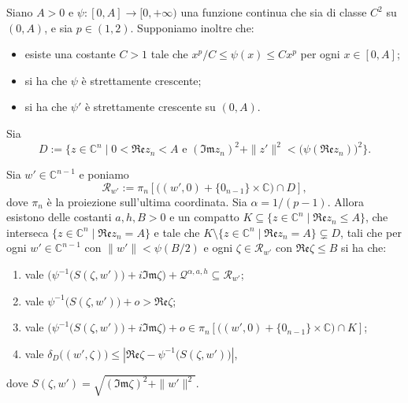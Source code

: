 \begin{lm}\label{6punto4}
    Siano $A>0$ e $\psi:[0,A]\longrightarrow[0,+\infty)$ una funzione continua che sia di classe $C^2$ su $(0,A)$, e sia $p\in(1,2)$. Supponiamo inoltre che:
    \begin{itemize}
        \item esiste una costante $C>1$ tale che $x^p/C\le\psi(x)\le Cx^p$ per ogni $x\in[0,A]$;
        \item si ha che $\psi$ è strettamente crescente;
        \item si ha che $\psi'$ è strettamente crescente su $(0,A)$.
    \end{itemize}

    Sia
    $$D:=\{z\in\mathbb{C}^n\mid 0<\mathfrak{Re}z_n<A\text{ e }(\mathfrak{Im}z_n)^2+\|z'\|^2<\big(\psi(\mathfrak{Re}z_n)\big)^2\}.$$

    Sia $w'\in\mathbb{C}^{n-1}$ e poniamo
    $$\mathcal{R}_{w'}:=\pi_n\left[\big((w',0)+\{0_{n-1}\}\times\mathbb{C}\big)\cap D\right],$$
    dove $\pi_n$ è la proiezione sull'ultima coordinata. Sia $\alpha=1/(p-1)$. Allora esistono delle costanti $a,h,B>0$ e un compatto $K\subseteq\{z\in\mathbb{C}^n\mid\mathfrak{Re}z_n\le A\}$, che interseca $\{z\in\mathbb{C}^n\mid\mathfrak{Re}z_n=A\}$ e tale che $K\setminus\{z\in\mathbb{C}^n\mid\mathfrak{Re}z_n=A\}\subsetneq D$, tali che per ogni $w'\in\mathbb{C}^{n-1}$ con $\|w'\|<\psi(B/2)$ e ogni $\zeta\in\mathcal{R}_{w'}$ con $\mathfrak{Re}\zeta\le B$ si ha che:
    \begin{enumerate}[label={(\arabic*)}]
        \item vale $\Big(\psi^{-1}\big(S(\zeta,w')\big)+i\mathfrak{Im}\zeta\Big)+\mathcal{Q}^{\alpha,a,h}\subseteq\mathcal{R}_{w'}$;
        \item vale $\psi^{-1}\big(S(\zeta,w')\big)+o>\mathfrak{Re}\zeta$;
        \item vale $\Big(\psi^{-1}\big(S(\zeta,w')\big)+i\mathfrak{Im}\zeta\Big)+o\in\pi_n\left[\big((w',0)+\{0_{n-1}\}\times\mathbb{C}\big)\cap K\right]$;
        \item vale $\delta_D\big((w',\zeta)\big) \le \left|\mathfrak{Re}\zeta-\psi^{-1}\big(S(\zeta,w')\big)\right|$,
    \end{enumerate}
    dove $S(\zeta,w')=\sqrt{(\mathfrak{Im}\zeta)^2+\|w'\|^2}$.
\end{lm}

